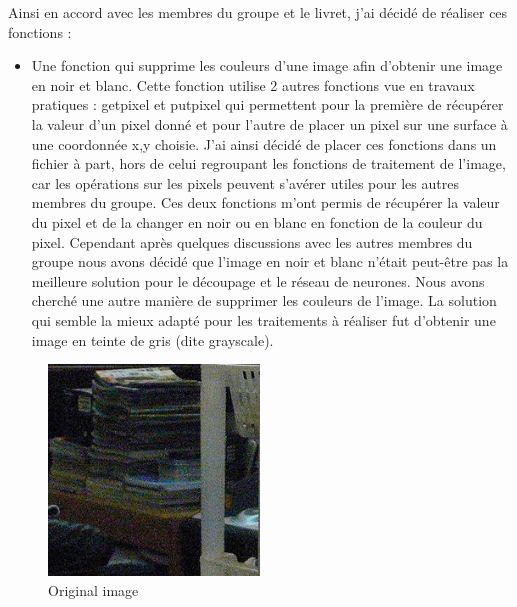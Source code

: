 \documentclass[12pt]{report}
\begin{document}
Ainsi en accord avec les membres du groupe et le livret, j’ai décidé de réaliser ces fonctions :

\newpage
\begin{itemize}[label=\textbullet]
	\item Une fonction qui supprime les couleurs d’une image afin d’obtenir une image en noir et blanc. Cette fonction utilise 2 autres fonctions vue en travaux pratiques : getpixel et putpixel qui permettent pour la première de récupérer la valeur d’un pixel donné et pour l’autre de placer un pixel sur une surface à une coordonnée x,y choisie. J’ai ainsi décidé de placer ces fonctions dans un fichier à part, hors de celui regroupant les fonctions de traitement de l’image, car les opérations sur les pixels peuvent s’avérer utiles pour les autres membres du groupe. Ces deux fonctions m’ont permis de récupérer la valeur du pixel et de la changer en noir ou en blanc en fonction de la couleur du pixel. Cependant après quelques discussions avec les autres membres du groupe nous avons décidé que l’image en noir et blanc n’était peut-être pas la meilleure solution pour le découpage et le réseau de neurones. Nous avons cherché une autre manière de supprimer les couleurs de l’image. La solution qui semble la mieux adapté pour les traitements à réaliser fut d’obtenir une image en teinte de gris (dite grayscale).
\end{itemize}
\begin{figure}[H]
    \centering
    \includegraphics[width=0.5\textwidth]{noise}
    \caption{Original image}
\end{figure}
\end{document}
